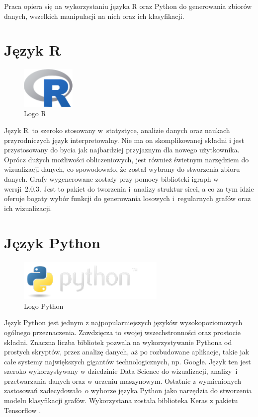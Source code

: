 Praca opiera się na wykorzystaniu języka R \cite{strR} oraz Python \cite{strPython} do generowania zbiorów danych,
wszelkich manipulacji na nich oraz ich klasyfikacji.

\section{Język R}

\begin{figure}[ht]
	\centering
	\includegraphics[height=2cm]{resources/technologies/images/logo_r.png}
	\caption{Logo R \cite{strR}}
	\label{Fig:tech-r}
\end{figure}
\FloatBarrier

Język R~to szeroko stosowany w~statystyce, analizie danych oraz naukach przyrodniczych język interpretowalny.
Nie ma on skomplikowanej składni i jest przystosowany do bycia jak najbardziej przyjaznym dla nowego użytkownika.
Oprócz dużych możliwości obliczeniowych, jest również świetnym narzędziem do wizualizacji danych,
co spowodowało, że został wybrany do stworzenia zbioru danych.
Grafy wygenerowane zostały przy pomocy biblioteki igraph \cite{strIgraph} w wersji~2.0.3.
Jest to pakiet do tworzenia i~analizy struktur sieci, a co za tym idzie oferuje bogaty wybór funkcji do
generowania losowych i~regularnych grafów oraz ich wizualizacji.

\section{Język Python}

\begin{figure}[ht]
	\centering
	\includegraphics[height=2cm]{resources/technologies/images/logo_python.png}
	\caption{Logo Python \cite{strPython}}
	\label{Fig:tech-python}
\end{figure}
\FloatBarrier

Język Python jest jednym z najpopularniejszych języków wysokopoziomowych ogólnego przeznaczenia.
Zawdzięcza to swojej wszechstronności oraz prostocie składni.
Znaczna liczba bibliotek pozwala na wykorzystywanie Pythona od
prostych skryptów, przez analizę danych, aż po rozbudowane aplikacje, takie jak całe
systemy największych gigantów technologicznych, np. Google. Język ten jest szeroko
wykorzystywany w dziedzinie Data Science do wizualizacji, analizy~i przetwarzania danych oraz w uczeniu maszynowym.
Ostatnie z wymienionych zastosowań zadecydowało~o wyborze języka Python jako narzędzia do stworzenia modelu klasyfikacji grafów.
Wykorzystana została biblioteka Keras z pakietu Tensorflow \cite{strTensorFlow}.

